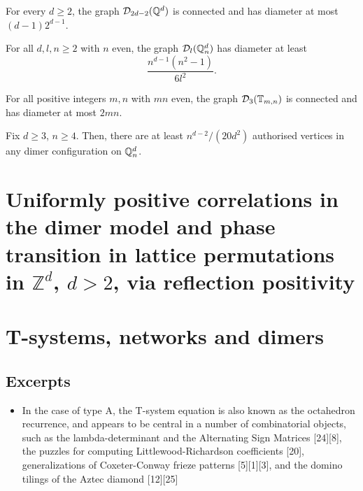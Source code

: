 \begin{theorem}[Ergodicity on $\bQ^d$]\label{thm-dynamics-6}
	For every $d \geq 2$, the graph $\mathcal{D}_{2d - 2}(\mathbb{Q}^d)$ is connected and has diameter at most $(d - 1) 2^{d - 1}$.
\end{theorem}

\begin{theorem}\label{thm-dynamics-7}
	For all $d, l, n \geq 2$ with $n$ even, the graph $\mathcal{D}_{l}(\mathbb{Q}^d_n)$ has diameter at least $$\frac{n^{d - 1} (n^2 - 1)}{6l^2}.$$
\end{theorem}

\begin{theorem}[Ergodicity on $\bT_{m,n}$]\label{thm-dynamics-8}
	For all positive integers $m, n$ with $mn$ even, the graph $\mathcal{D}_{3}(\mathbb{T}_{m,n})$ is connected and has diameter at most $2mn$.
\end{theorem}

\begin{lemma}\label{lemma-dynamics-10}
	Fix $d \geq 3$, $n \geq 4$. Then, there are at least $n^{d-2}/(20d^2)$ authorised vertices in any dimer configuration on $\mathbb{Q}_n^d$. 
\end{lemma}

\section{Uniformly positive correlations in the dimer model and
	phase transition in lattice permutations in $\mathbb{Z}^d$, $d > 2$, via reflection positivity \cite{taggi2019uniformly}}

\section{T-systems, networks and dimers \cite{di2014tystemsnetworksdimers}	}
\subsection{Excerpts}
\begin{itemize}
	\item  In the case of type A, the T-system equation is also known as the octahedron recurrence, and appears to be central in a number of combinatorial objects, such as the lambda-determinant and the Alternating Sign Matrices [24][8], the puzzles for computing Littlewood-Richardson coefficients [20], generalizations of Coxeter-Conway frieze patterns [5][1][3], and the domino tilings of the Aztec diamond [12][25]
\end{itemize}


